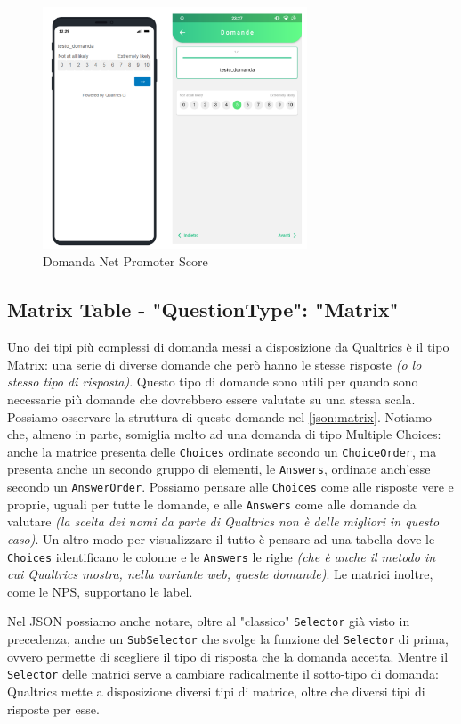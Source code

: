 \begin{figure}[ht!]
\centering
\includegraphics[width=0.7\textwidth]{img/nps}
\caption{Domanda Net Promoter Score}
\label{fig:nps}
\end{figure}

\clearpage
\subsection{Matrix Table - "QuestionType": "Matrix"}
Uno dei tipi più complessi di domanda messi a disposizione da Qualtrics è il tipo Matrix: una serie di diverse domande che però hanno le stesse risposte \textit{(o lo stesso tipo di risposta)}. Questo tipo di domande sono utili per quando sono necessarie più domande che dovrebbero essere valutate su una stessa scala. Possiamo osservare la struttura di queste domande nel \autoref{json:matrix}. Notiamo che, almeno in parte, somiglia molto ad una domanda di tipo Multiple Choices: anche la matrice presenta delle \texttt{Choices} ordinate secondo un \texttt{ChoiceOrder}, ma presenta anche un secondo gruppo di elementi, le \texttt{Answers}, ordinate anch'esse secondo un \texttt{AnswerOrder}.
Possiamo pensare alle \texttt{Choices} come alle risposte vere e proprie, uguali per tutte le domande, e alle \texttt{Answers} come alle domande da valutare \textit{(la scelta dei nomi da parte di Qualtrics non è delle migliori in questo caso)}. Un altro modo per visualizzare il tutto è pensare ad una tabella	dove le \texttt{Choices} identificano le colonne e le \texttt{Answers} le righe \textit{(che è anche il metodo in cui Qualtrics mostra, nella variante web, queste domande)}. Le matrici inoltre, come le NPS, supportano le label.

Nel JSON possiamo anche notare, oltre al "classico" \texttt{Selector} già visto in precedenza, anche un \texttt{SubSelector} che svolge la funzione del \texttt{Selector} di prima, ovvero permette di scegliere il tipo di risposta che la domanda accetta. Mentre il \texttt{Selector} delle matrici serve a cambiare radicalmente il sotto-tipo di domanda: Qualtrics mette a disposizione diversi tipi di matrice, oltre che diversi tipi di risposte per esse.


